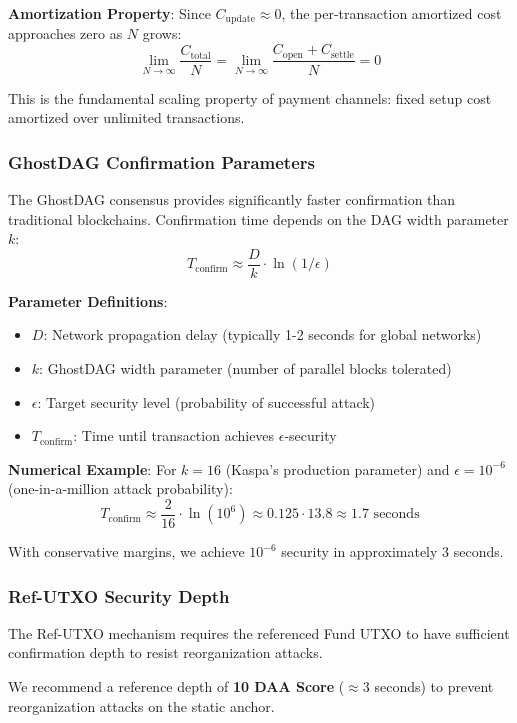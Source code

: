 \textbf{Amortization Property}:
Since $C_{\mathrm{update}} \approx 0$, the per-transaction amortized cost approaches zero as $N$ grows:
$$\lim_{N \to \infty} \frac{C_{\mathrm{total}}}{N} = \lim_{N \to \infty} \frac{C_{\mathrm{open}} + C_{\mathrm{settle}}}{N} = 0$$

This is the fundamental scaling property of payment channels: fixed setup cost amortized over unlimited transactions.

\subsubsection{GhostDAG Confirmation Parameters}

The GhostDAG consensus provides significantly faster confirmation than traditional blockchains. Confirmation time depends on the DAG width parameter $k$:
$$ T_{\mathrm{confirm}} \approx \frac{D}{k} \cdot \ln(1/\epsilon) $$

\textbf{Parameter Definitions}:
\begin{itemize}
    \item $D$: Network propagation delay (typically 1-2 seconds for global networks)
    \item $k$: GhostDAG width parameter (number of parallel blocks tolerated)
    \item $\epsilon$: Target security level (probability of successful attack)
    \item $T_{\mathrm{confirm}}$: Time until transaction achieves $\epsilon$-security
\end{itemize}

\textbf{Numerical Example}:
For $k=16$ (Kaspa's production parameter) and $\epsilon = 10^{-6}$ (one-in-a-million attack probability):
$$T_{\mathrm{confirm}} \approx \frac{2}{16} \cdot \ln(10^6) \approx 0.125 \cdot 13.8 \approx 1.7 \text{ seconds}$$

With conservative margins, we achieve $10^{-6}$ security in approximately 3 seconds.

\subsubsection{Ref-UTXO Security Depth}

The Ref-UTXO mechanism requires the referenced Fund UTXO to have sufficient confirmation depth to resist reorganization attacks.

We recommend a reference depth of \textbf{10 DAA Score} ($\approx 3$ seconds) to prevent reorganization attacks on the static anchor.

